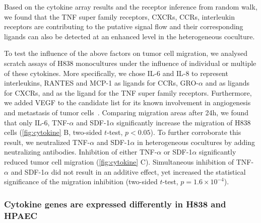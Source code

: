 Based on the cytokine array results and the receptor inference from random walk, 
we found that the TNF super family receptors, CXCRs, CCRs,
interleukin receptors are contributing to the putative 
signal flow and their corresponding ligands can also be
detected at an enhanced level in the heterogeneous coculture.

To test the influence of the above factors on tumor cell migration,
we analysed scratch assays of H838 monocultures under the influence of 
individual or multiple of these cytokines. 
More specifically, we chose IL-6 and IL-8 to represent 
interleukins, RANTES and MCP-1 as ligands for CCRs, 
GRO-$\alpha$ and \sdfonea as ligands for CXCRs, and \tnfa
as the ligand for the TNF super family receptors.
Furthermore, we added VEGF to the candidate list for its known involvement in
angiogenesis and metastasis of tumor cells~\citep{Ferrara2003,Hiratsuka2002}. 
Comparing migration areas after 24h, 
we found that only IL-6, TNF-$\alpha$ and SDF-1$\alpha$ significantly 
increase the migration of H838 cells (\ref{fig:cytokine} B, two-sided $t$-test,
$p < 0.05$). 
To further corroborate this result, we neutralized 
TNF-$\alpha$ and SDF-1$\alpha$ in heterogeneous cocultures  by adding neutralizing antibodies.
Inhibition of  either TNF-$\alpha$ or SDF-1$\alpha$ significantly reduced tumor cell migration (\ref{fig:cytokine} C). 
Simultaneous inhibition of TNF-$\alpha$ and SDF-1$\alpha$ did not result in an additive effect, yet increased the statistical significance of the migration 
inhibition
(two-sided $t$-test, $p=1.6\times10^{-4}$).

\subsubsection{Cytokine genes are expressed differently in H838 and HPAEC}

